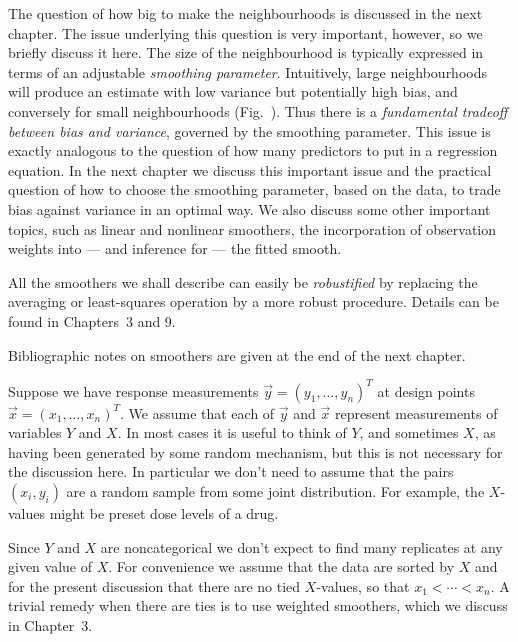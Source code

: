 The question of how big to make the neighbourhoods is discussed in
the next chapter.
The issue underlying this question is very important, however, so we briefly
discuss it here.
%
The size of the neighbourhood is typically expressed in terms of an
adjustable {\sl smoothing parameter}.
Intuitively, large neighbourhoods will produce an estimate with low
variance but potentially high bias, and conversely for small
neighbourhoods (Fig.~\spansizes).
%
%
Thus there is a {\sl fundamental tradeoff between bias and variance},
governed by the smoothing parameter.
This issue is exactly analogous to the question of how many predictors to put
in a regression equation.
%
In the 
next
 chapter  we discuss this important issue and the practical
question of how to choose the smoothing parameter, based on the data,
to  trade bias against variance in an optimal way.
%
 We also discuss some other important topics, such as
linear and nonlinear smoothers, the
incorporation of  observation weights into --- and inference
for --- the
fitted smooth.

%
All the smoothers we shall describe can easily be {\em robustified} by replacing the averaging or least-squares operation by a more robust procedure.
Details can be found in Chapters~3 and  9.

%
 
Bibliographic notes  on smoothers are given at  the end
of the next chapter.

%
%
\Sectionskip
{}
Suppose we have response measurements $\vec y=(y_1,\ldots,y_n)^T$ at design
points $\vec x=(x_1,\ldots,
 x_n)^T$.  We assume that each of $\vec y$ and $\vec x$ represent  
measurements of variables $Y$ and $X$. 
In most cases it is useful to think of
$Y$, and sometimes $X$, as having been generated by some random mechanism, but this is not
necessary for the discussion here.
In particular we don't need to assume
 that the pairs $(x_i,y_i)$ are  a random sample from some joint distribution.
 For 
example, the $X$-values might be preset dose levels of a drug. 



Since  $Y$ and $X$ are noncategorical we don't expect to find
many replicates at any given value of $X$. 
For convenience we assume 
that the data are sorted by $X$ 
and for the present discussion  that there are no tied $X$-values, so that
$x_1 < \cdots < x_n$.
A trivial remedy when there are ties is to use weighted smoothers, which we 
%
discuss in  Chapter~3. 

